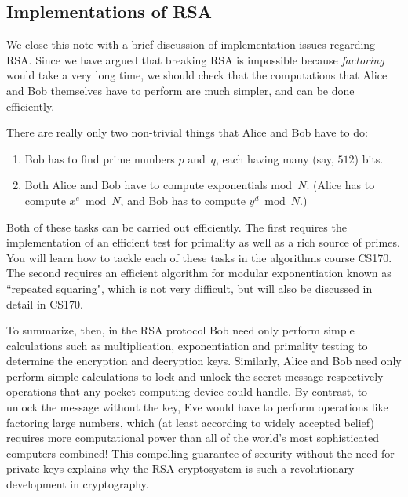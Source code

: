 \documentclass[11pt]{article}
\newcounter{thm}
\begin{document}
\subsection{Implementations of RSA}

We close this note with a brief discussion of implementation issues regarding RSA.  Since we have argued that breaking RSA is impossible because {\it factoring\/} would take a very
long time, we should check that the computations that Alice and Bob themselves have
to perform are much simpler, and can be done efficiently.

There are really only two non-trivial things that Alice and Bob have to do:
\begin{enumerate}
\item Bob has to find prime numbers $p$ and~$q$, each having many (say, $512$) bits.
\item Both Alice and Bob have to compute exponentials mod~$N$.  (Alice has to
compute $x^e\bmod N$, and Bob has to compute $y^d\bmod N$.)
\end{enumerate}

Both of these tasks can be carried out efficiently. The first requires the implementation of an efficient test for primality as well as a rich source of primes. You will learn how
to tackle each of these tasks in the algorithms course CS170. The second requires
an efficient algorithm for modular exponentiation known as ``repeated squaring", which is not very difficult, but will also be discussed in detail in CS170.


To summarize, then, in the RSA protocol Bob need only perform simple calculations
such as multiplication, exponentiation and primality testing to determine the encryption and decryption keys. Similarly, Alice and Bob need only perform simple calculations to lock and
unlock the secret message respectively --- operations that any pocket computing device
could handle.  By contrast, to unlock the message without the key, Eve would have
to perform operations like factoring large numbers, which (at least according to widely
accepted belief) requires more computational power than all of the world's most sophisticated
computers combined!  This compelling guarantee of security without the need for
private keys explains why the RSA cryptosystem is such a revolutionary development
in cryptography.
\end{document}
